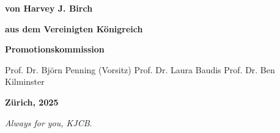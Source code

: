 \documentclass[a4paper,11pt,usegeometry]{scrreprt} %
\begin{document}
\begin{titlepage}
\begin{center}
\bfseries %
von%
\break
\break
\mdseries %
Harvey J. Birch%
\break

\bfseries %
aus%
\break
\break
\mdseries %
dem Vereinigten K\"onigreich%
\break
\break
\break
\break

\bfseries %
Promotionskommission%
\vspace{3pt}%
\break
\break
\hspace*{11.5mm}%
\begin{minipage}{7cm}
\flushleft %
\mdseries %
Prof. Dr. Bj\"orn Penning (Vorsitz) %
\break
\break
Prof. Dr.  Laura Baudis%
\break
\break
Prof. Dr. Ben Kilminster%
\end{minipage}
\break
\break
\break
\break
\break
\break

\bfseries%
Z\"urich, 2025%

\end{center}
\end{titlepage}
\restoregeometry
{}
\newpage\null\thispagestyle{empty}\newpage
\clearpage
\vspace*{\fill}
\begin{center}
\begin{minipage}{.6\textwidth}
\textit{Always for you, KJCB}.
\end{minipage}
\end{center}
\vfill %
\clearpage
\newpage\null\thispagestyle{empty}\newpage
\justifying
\end{document}
